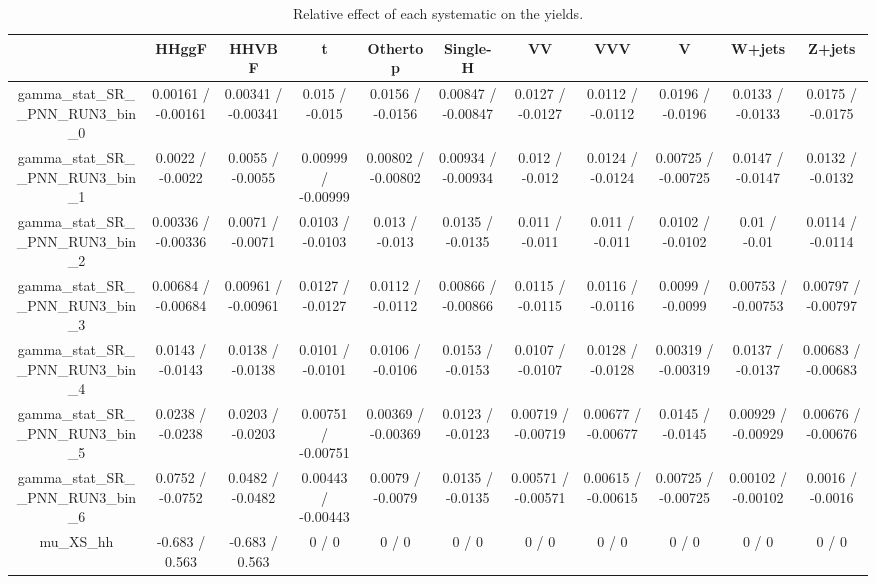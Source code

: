 \documentclass[10pt]{article}
\begin{document}
\begin{table}[htbp]
\begin{center}
\begin{tabular}{|c|c|c|c|c|c|c|c|c|c|c|}
\hline 
      & HHggF      & HHVBF      & t      & Othertop      & Single-H      & VV      & VVV      & V      & W+jets      & Z+jets \\ 
\hline 
  gamma_stat_SR__PNN_RUN3_bin_0 & 0.00161 / -0.00161 & 0.00341 / -0.00341 & 0.015 / -0.015 & 0.0156 / -0.0156 & 0.00847 / -0.00847 & 0.0127 / -0.0127 & 0.0112 / -0.0112 & 0.0196 / -0.0196 & 0.0133 / -0.0133 & 0.0175 / -0.0175 \\ 
  gamma_stat_SR__PNN_RUN3_bin_1 & 0.0022 / -0.0022 & 0.0055 / -0.0055 & 0.00999 / -0.00999 & 0.00802 / -0.00802 & 0.00934 / -0.00934 & 0.012 / -0.012 & 0.0124 / -0.0124 & 0.00725 / -0.00725 & 0.0147 / -0.0147 & 0.0132 / -0.0132 \\ 
  gamma_stat_SR__PNN_RUN3_bin_2 & 0.00336 / -0.00336 & 0.0071 / -0.0071 & 0.0103 / -0.0103 & 0.013 / -0.013 & 0.0135 / -0.0135 & 0.011 / -0.011 & 0.011 / -0.011 & 0.0102 / -0.0102 & 0.01 / -0.01 & 0.0114 / -0.0114 \\ 
  gamma_stat_SR__PNN_RUN3_bin_3 & 0.00684 / -0.00684 & 0.00961 / -0.00961 & 0.0127 / -0.0127 & 0.0112 / -0.0112 & 0.00866 / -0.00866 & 0.0115 / -0.0115 & 0.0116 / -0.0116 & 0.0099 / -0.0099 & 0.00753 / -0.00753 & 0.00797 / -0.00797 \\ 
  gamma_stat_SR__PNN_RUN3_bin_4 & 0.0143 / -0.0143 & 0.0138 / -0.0138 & 0.0101 / -0.0101 & 0.0106 / -0.0106 & 0.0153 / -0.0153 & 0.0107 / -0.0107 & 0.0128 / -0.0128 & 0.00319 / -0.00319 & 0.0137 / -0.0137 & 0.00683 / -0.00683 \\ 
  gamma_stat_SR__PNN_RUN3_bin_5 & 0.0238 / -0.0238 & 0.0203 / -0.0203 & 0.00751 / -0.00751 & 0.00369 / -0.00369 & 0.0123 / -0.0123 & 0.00719 / -0.00719 & 0.00677 / -0.00677 & 0.0145 / -0.0145 & 0.00929 / -0.00929 & 0.00676 / -0.00676 \\ 
  gamma_stat_SR__PNN_RUN3_bin_6 & 0.0752 / -0.0752 & 0.0482 / -0.0482 & 0.00443 / -0.00443 & 0.0079 / -0.0079 & 0.0135 / -0.0135 & 0.00571 / -0.00571 & 0.00615 / -0.00615 & 0.00725 / -0.00725 & 0.00102 / -0.00102 & 0.0016 / -0.0016 \\ 
  mu_XS_hh & -0.683 / 0.563 & -0.683 / 0.563 & 0 / 0 & 0 / 0 & 0 / 0 & 0 / 0 & 0 / 0 & 0 / 0 & 0 / 0 & 0 / 0 \\ 
\hline 
\end{tabular} 
\caption{Relative effect of each systematic on the yields.} 
\end{center} 
\end{table} 
\end{document}
